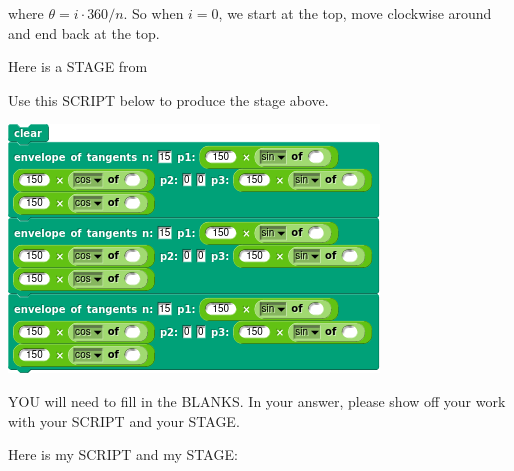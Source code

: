 \documentclass[noauthor,nooutcomes,12pt,hints]{ximera}
\begin{document}
\begin{question}
\begin{freeResponse}
\begin{center}
    \end{center}
    where $\theta = i\cdot 360/n$. So when $i=0$, we start at the top,
    move clockwise around and end back at the top.
  \end{freeResponse}
\end{question}

\mynewpage





\begin{question}
  Here is a STAGE from \snap\
  \begin{center}
  \end{center}
  Use this SCRIPT below to produce the stage above. 
    \begin{center}
    \includegraphics{triEnvScriptBLANK.png}
    \end{center}
    YOU will need to fill in the BLANKS.  In your answer, please show
    off your work with your SCRIPT and your STAGE.
  \begin{freeResponse}
    Here is my SCRIPT and my STAGE:
    \begin{center}

\end{center}
\end{freeResponse}
\end{question}
\end{document}
